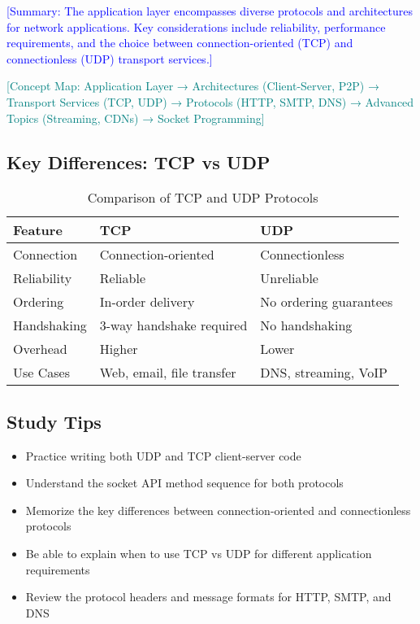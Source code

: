 \documentclass[12pt]{article}
\begin{document}
\textcolor{blue}{[Summary: The application layer encompasses diverse protocols and architectures for network applications. Key considerations include reliability, performance requirements, and the choice between connection-oriented (TCP) and connectionless (UDP) transport services.]}

\textcolor{teal}{[Concept Map: Application Layer → Architectures (Client-Server, P2P) → Transport Services (TCP, UDP) → Protocols (HTTP, SMTP, DNS) → Advanced Topics (Streaming, CDNs) → Socket Programming]}

\subsection*{Key Differences: TCP vs UDP}

\begin{table}[h]
    \centering
    \begin{tabular}{|l|l|l|}
        \hline
        \textbf{Feature} & \textbf{TCP}              & \textbf{UDP}           \\
        \hline
        Connection       & Connection-oriented       & Connectionless         \\
        Reliability      & Reliable                  & Unreliable             \\
        Ordering         & In-order delivery         & No ordering guarantees \\
        Handshaking      & 3-way handshake required  & No handshaking         \\
        Overhead         & Higher                    & Lower                  \\
        Use Cases        & Web, email, file transfer & DNS, streaming, VoIP   \\
        \hline
    \end{tabular}
    \caption{Comparison of TCP and UDP Protocols}
\end{table}

\subsection*{Study Tips}

\begin{itemize}
    \item Practice writing both UDP and TCP client-server code
    \item Understand the socket API method sequence for both protocols
    \item Memorize the key differences between connection-oriented and connectionless protocols
    \item Be able to explain when to use TCP vs UDP for different application requirements
    \item Review the protocol headers and message formats for HTTP, SMTP, and DNS
\end{itemize}
\end{document}

